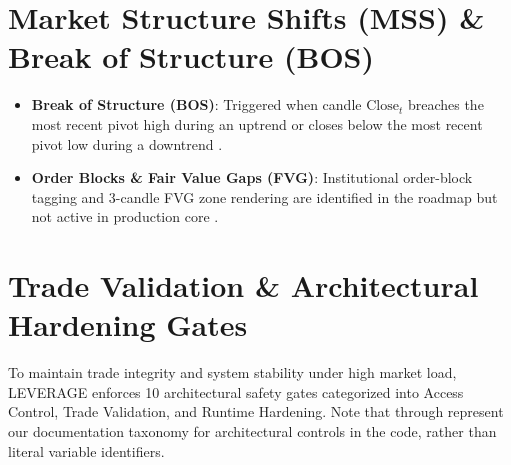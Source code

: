 \section{Market Structure Shifts (MSS) \& Break of Structure (BOS)}
\begin{itemize}[leftmargin=6mm,itemsep=1.5mm]
    \item \textbf{Break of Structure (BOS)}: Triggered when candle $\mathrm{Close}_t$ breaches the most recent pivot high during an uptrend or closes below the most recent pivot low during a downtrend .
    \item \textbf{Order Blocks \& Fair Value Gaps (FVG)}: Institutional order-block tagging and 3-candle FVG zone rendering are identified in the roadmap but not active in production core .
\end{itemize}

\section{Trade Validation \& Architectural Hardening Gates}
To maintain trade integrity and system stability under high market load, LEVERAGE enforces 10 architectural safety gates categorized into Access Control, Trade Validation, and Runtime Hardening. Note that  through  represent our documentation taxonomy for architectural controls in the code, rather than literal variable identifiers.

